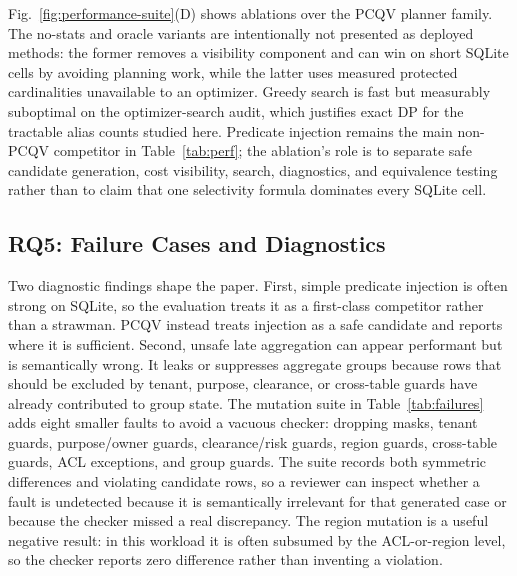\documentclass[conference]{IEEEtran}
\newcommand{\pcqv}{PCQV}
\begin{document}
Fig.~\ref{fig:performance-suite}(D) shows ablations over the \pcqv{} planner family. The no-stats and oracle variants are intentionally not presented as deployed methods: the former removes a visibility component and can win on short SQLite cells by avoiding planning work, while the latter uses measured protected cardinalities unavailable to an optimizer. Greedy search is fast but measurably suboptimal on the optimizer-search audit, which justifies exact DP for the tractable alias counts studied here. Predicate injection remains the main non-\pcqv{} competitor in Table~\ref{tab:perf}; the ablation's role is to separate safe candidate generation, cost visibility, search, diagnostics, and equivalence testing rather than to claim that one selectivity formula dominates every SQLite cell.


\subsection{RQ5: Failure Cases and Diagnostics}
Two diagnostic findings shape the paper. First, simple predicate injection is often strong on SQLite, so the evaluation treats it as a first-class competitor rather than a strawman. \pcqv{} instead treats injection as a safe candidate and reports where it is sufficient. Second, unsafe late aggregation can appear performant but is semantically wrong. It leaks or suppresses aggregate groups because rows that should be excluded by tenant, purpose, clearance, or cross-table guards have already contributed to group state. The mutation suite in Table~\ref{tab:failures} adds eight smaller faults to avoid a vacuous checker: dropping masks, tenant guards, purpose/owner guards, clearance/risk guards, region guards, cross-table guards, ACL exceptions, and group guards. The suite records both symmetric differences and violating candidate rows, so a reviewer can inspect whether a fault is undetected because it is semantically irrelevant for that generated case or because the checker missed a real discrepancy. The region mutation is a useful negative result: in this workload it is often subsumed by the ACL-or-region level, so the checker reports zero difference rather than inventing a violation.
\end{document}
